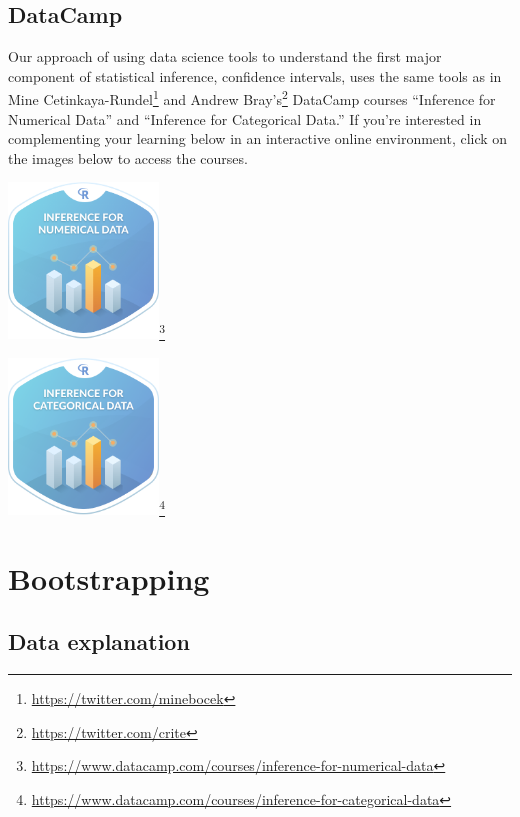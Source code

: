 \documentclass[12pt,]{krantz}
\renewcommand{\href}[2]{#2\footnote{\url{#1}}}
\theoremstyle{definition}
\theoremstyle{definition}
\theoremstyle{definition}
\theoremstyle{remark}
\begin{document}
\subsection*{DataCamp}\label{datacamp-5}


Our approach of using data science tools to understand the first major
component of statistical inference, confidence intervals, uses the same
tools as in \href{https://twitter.com/minebocek}{Mine Cetinkaya-Rundel}
and \href{https://twitter.com/crite}{Andrew Bray's} DataCamp courses
``Inference for Numerical Data'' and ``Inference for Categorical Data.''
If you're interested in complementing your learning below in an
interactive online environment, click on the images below to access the
courses.

\begin{center}
\href{https://www.datacamp.com/courses/inference-for-numerical-data}{\includegraphics[width=0.3\textwidth]{images/datacamp_inference_for_numerical_data.png}}
\end{center}\begin{center}
\href{https://www.datacamp.com/courses/inference-for-categorical-data}{\includegraphics[width=0.3\textwidth]{images/datacamp_inference_for_categorical_data.png}}
\end{center}

\section{Bootstrapping}\label{bootstrapping}

\subsection{Data explanation}\label{data-explanation}
\end{document}
